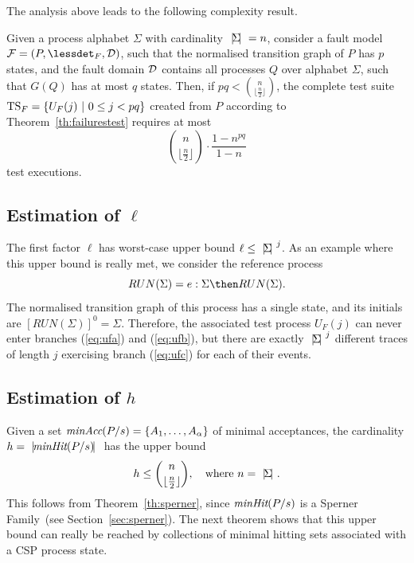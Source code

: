 %
The analysis above leads to the following complexity result.
%
\begin{theorem}
Given a process alphabet $\Sigma$ with cardinality $
{~|\! \Sigma\!|~} = n$, consider a fault model ${\cal F} = (P,\lessdet_F,{\cal D})$, such that
the normalised transition graph of $P$ has $p$ states, and the fault domain 
${\cal D}$ contains all processes $Q$ over alphabet $\Sigma$, such that $G(Q)$ has at most $q$ states. Then, if $pq < \binom{n}{\lfloor\frac{n}{2}\rfloor}$, the complete
test suite ${\text{TS}}_F = \{ U_F(j)~|~0 \le j < pq  \}$ created from $P$ according to Theorem~\ref{th:failurestest}
requires at most 
%
\begin{equation*}
\binom{n}{\lfloor\frac{n}{2}\rfloor}\cdot\frac{1-n^{pq}}{1-n}
\end{equation*}
%
test executions.
\xbox
\end{theorem}


\subsection{Estimation of $\ell$}
The first factor $\ell$ has worst-case upper bound $\ell\le {~|\! \Sigma\!|~}^j$.
As an example where this upper bound is really met, we consider the reference
process
\[
RUN(\Sigma) = e:\Sigma \then RUN(\Sigma).
\]
The normalised transition graph of this process has a single state, and its initials
are $[RUN(\Sigma)]^0 = \Sigma$. Therefore, the associated test process $U_F(j)$ can
never enter branches (\ref{eq:ufa}) and (\ref{eq:ufb}), but there are exactly
${~|\! \Sigma\!|~}^j$ different traces of length $j$ exercising branch (\ref{eq:ufc})
for each of their events.

\subsection{Estimation of $h$}
Given a set $\text{\it minAcc}(P/s) = \{ A_1,\dots, A_\alpha \}$ of   minimal
acceptances, the cardinality   $h = {~|\! \text{\it minHit}(P/s)\!|~}$ has the upper bound
\[
h \le \binom{n}{\lfloor\frac{n}{2}\rfloor}, \quad \text{where $n = {~|\! \Sigma\!|~}$.}
\]
This follows from Theorem~\ref{th:sperner}, since $\text{\it minHit}(P/s)$ is a
Sperner Family~(see Section~\ref{sec:sperner}). The next theorem shows that
this upper bound can really be reached by collections of minimal hitting sets
associated with a CSP process state.

